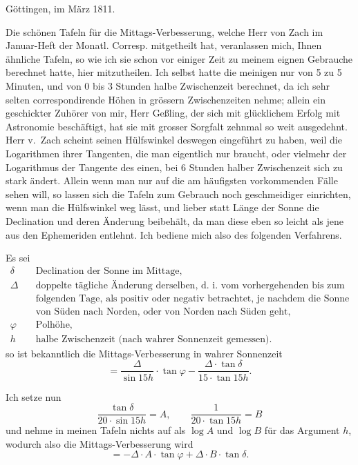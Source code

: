 \documentclass[10pt,a4paper]{article}
\begin{document}
\vspace{0.5em}
\noindent
Göttingen, im März 1811.

\medskip
\noindent
Die schönen Tafeln für die Mittags-Verbesserung, welche Herr von Zach im Januar-Heft der Monatl. Corresp. mitgetheilt hat, veranlassen mich, Ihnen ähnliche Tafeln, so wie ich sie schon vor einiger Zeit zu meinem eignen Gebrauche berechnet hatte, hier mitzutheilen. Ich selbst hatte die meinigen nur von 5 zu 5 Minuten, und von 0 bis 3 Stunden halbe Zwischenzeit berechnet, da ich sehr selten correspondirende Höhen in grössern Zwischenzeiten nehme; allein ein geschickter Zuhörer von mir, Herr Geßling, der sich mit glücklichem Erfolg mit Astronomie beschäftigt, hat sie mit grosser Sorgfalt zehnmal so weit ausgedehnt. Herr v.~Zach scheint seinen Hülfswinkel deswegen eingeführt zu haben, weil die Logarithmen ihrer Tangenten, die man eigentlich nur braucht, oder vielmehr der Logarithmus der Tangente des einen, bei 6 Stunden halber Zwischenzeit sich zu stark ändert. Allein wenn man nur auf die am häufigsten vorkommenden Fälle sehen will, so lassen sich die Tafeln zum Gebrauch noch geschmeidiger einrichten, wenn man die Hülfswinkel weg lässt, und lieber statt Länge der Sonne die Declination und deren Änderung beibehält, da man diese eben so leicht als jene aus den Ephemeriden entlehnt. Ich bediene mich also des folgenden Verfahrens.

Es sei
\begin{align*}
\delta &\quad \text{Declination der Sonne im Mittage,} \\
\Delta &\quad \text{doppelte tägliche Änderung derselben, d. i. vom vorhergehenden bis zum}\\
       &\quad \text{folgenden Tage, als positiv oder negativ betrachtet, je nachdem die Sonne}\\
       &\quad \text{von Süden nach Norden, oder von Norden nach Süden geht,} \\
\varphi &\quad \text{Polhöhe,} \\
h &\quad \text{halbe Zwischenzeit (nach wahrer Sonnenzeit gemessen).}
\end{align*}
so ist bekanntlich die Mittags-Verbesserung in wahrer Sonnenzeit
\[
= \frac{\Delta}{\sin 15h} \cdot \tan\varphi - \frac{\Delta \cdot \tan\delta}{15 \cdot \tan 15h}.
\]

Ich setze nun
\[
\frac{\tan\delta}{20 \cdot \sin 15h} = A, \qquad \frac{1}{20 \cdot \tan 15h} = B
\]
und nehme in meinen Tafeln nichts auf als $\log A$ und $\log B$ für das Argument $h$, wodurch also die Mittags-Verbesserung wird
\[
= -\Delta \cdot A \cdot \tan\varphi + \Delta \cdot B \cdot \tan\delta.
\]
\end{document}
